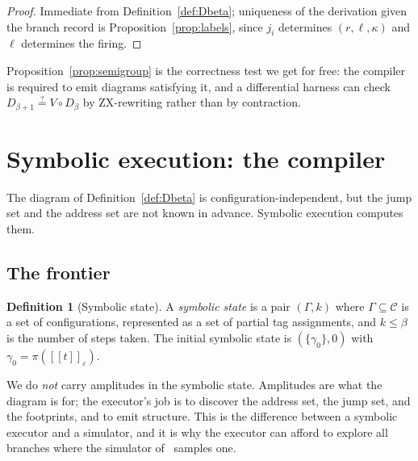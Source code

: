 \documentclass[11pt]{article}
\theoremstyle{definition}
\newtheorem{definition}{Definition}[section]
\theoremstyle{plain}
\newcommand{\sem}[1]{[\![#1]\!]}
\newcommand{\Cfg}{\mathcal{C}}
\begin{document}
\begin{proof}
Immediate from Definition~\ref{def:Dbeta}; uniqueness of the derivation given the branch record
is Proposition~\ref{prop:labels}, since $j_i$ determines $(r,\ell,\kappa)$ and $\ell$ determines
the firing.
\end{proof}

Proposition~\ref{prop:semigroup} is the correctness test we get for free: the compiler is
required to emit diagrams satisfying it, and a differential harness can check
$D_{\beta+1} \overset{?}{=} V \circ D_\beta$ by ZX-rewriting rather than by contraction.

\section{Symbolic execution: the compiler}\label{sec:symbolic}

The diagram of Definition~\ref{def:Dbeta} is configuration-independent, but the jump set and the
address set are not known in advance. Symbolic execution computes them.

\subsection{The frontier}

\begin{definition}[Symbolic state]\label{def:symstate}
A \emph{symbolic state} is a pair $(\Gamma, k)$ where $\Gamma \subseteq \Cfg$ is a set of
configurations, represented as a set of partial tag assignments, and $k \le \beta$ is the number
of steps taken. The initial symbolic state is $(\{\gamma_0\}, 0)$ with
$\gamma_0 = \pi(\sem{t}_\varepsilon)$.
\end{definition}

We do \emph{not} carry amplitudes in the symbolic state. Amplitudes are what the diagram is for;
the executor's job is to discover the address set, the jump set, and the footprints, and to emit
structure. This is the difference between a symbolic executor and a simulator, and it is why the
executor can afford to explore all branches where the simulator of~\cite{weighted} samples one.
\end{document}
